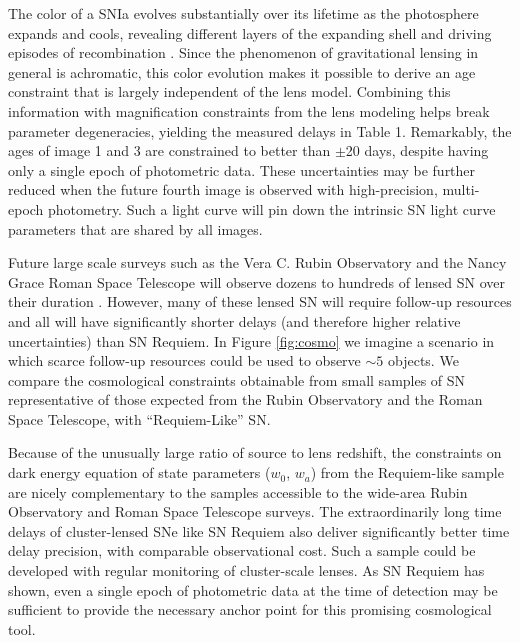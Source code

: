 \documentclass[12pt,dvipsnames]{article}
\begin{document}
The color of a SNIa evolves substantially over its lifetime as the photosphere expands and cools, revealing different layers of the expanding shell and driving episodes of recombination \cite{woosley_type_2007,kasen_type_2009}. Since the phenomenon of gravitational lensing in general is achromatic, this color evolution makes it possible to derive an age constraint that is largely independent of the lens model.  Combining this information with magnification constraints from the lens modeling helps break parameter degeneracies, yielding the measured delays in Table 1. 
Remarkably, the ages of image 1 and 3 are constrained to better than $\pm$20 days, despite having only a single epoch of photometric data.   These uncertainties may be 
further reduced when the future fourth image is observed with high-precision, multi-epoch photometry.  Such a light curve will pin down the intrinsic SN light curve parameters that are shared by all images.

Future large scale surveys such as the Vera C. Rubin Observatory 
and the Nancy Grace Roman Space Telescope will observe dozens to hundreds of lensed SN over their duration \cite{oguri_gravitationally_2010,goldstein_rates_2019,wojtak_magnified_2019}. However, many of these lensed SN will require follow-up resources and all will have significantly shorter delays (and therefore higher relative uncertainties) than SN Requiem. In Figure \ref{fig:cosmo} we imagine a scenario in which scarce follow-up resources could be used to observe $\sim5$ objects. We compare the cosmological constraints obtainable from small samples of SN representative of those expected from the Rubin Observatory and the Roman Space Telescope, with ``Requiem-Like'' SN. 


Because of the unusually large ratio of source to lens redshift, the constraints on dark energy equation of state parameters ($w_0$, $w_a$) from the Requiem-like sample are nicely complementary to the samples accessible to the wide-area Rubin Observatory and Roman Space Telescope surveys. The extraordinarily long time delays of cluster-lensed SNe like SN Requiem also deliver significantly better time delay precision, with comparable observational cost.  
Such a sample could be developed with regular monitoring of cluster-scale lenses.  As SN Requiem has shown, even a single epoch of photometric data at the time of detection may be sufficient to provide the necessary anchor point for this promising cosmological tool.  
\end{document}
